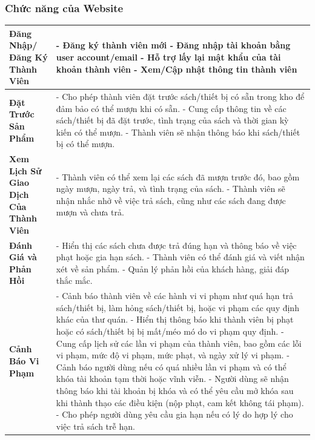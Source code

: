\documentclass{article}
\begin{document}
\subsubsection{Chức năng của Website}
\begin{table}[H]
\centering
\renewcommand{\arraystretch}{1.6}
\begin{tabular}{|p{5cm}|p{10cm}|}
\hline
\textbf{Đăng Nhập/Đăng Ký Thành Viên} & 
- Đăng ký thành viên mới \newline
- Đăng nhập tài khoản bằng user account/email \newline
- Hỗ trợ lấy lại mật khẩu của tài khoản thành viên \newline
- Xem/Cập nhật thông tin thành viên \\
\hline
\textbf{Đặt Trước Sản Phẩm} & 
- Cho phép thành viên đặt trước sách/thiết bị có sẵn trong kho để đảm bảo có thể mượn khi có sẵn. \newline
- Cung cấp thông tin về các sách/thiết bị đã đặt trước, tình trạng của sách và thời gian kỳ kiến có thể mượn. \newline
- Thành viên sẽ nhận thông báo khi sách/thiết bị có thể mượn. \\
\hline
\textbf{Xem Lịch Sử Giao Dịch Của Thành Viên} & 
- Thành viên có thể xem lại các sách đã mượn trước đó, bao gồm ngày mượn, ngày trả, và tình trạng của sách. \newline
- Thành viên sẽ nhận nhắc nhở về việc trả sách, cũng như các sách đang được mượn và chưa trả. \\
\hline
\textbf{Đánh Giá và Phản Hồi} & 
- Hiển thị các sách chưa được trả đúng hạn và thông báo về việc phạt hoặc gia hạn sách. \newline
- Thành viên có thể đánh giá và viết nhận xét về sản phẩm. \newline
- Quản lý phản hồi của khách hàng, giải đáp thắc mắc. \\
\hline
\textbf{Cảnh Báo Vi Phạm} & 
- Cảnh báo thành viên về các hành vi vi phạm như quá hạn trả sách/thiết bị, làm hỏng sách/thiết bị, hoặc vi phạm các quy định khác của thư quán. \newline
- Hiển thị thông báo khi thành viên bị phạt hoặc có sách/thiết bị bị mất/méo mó do vi phạm quy định. \newline
- Cung cấp lịch sử các lần vi phạm của thành viên, bao gồm các lỗi vi phạm, mức độ vi phạm, mức phạt, và ngày xử lý vi phạm. \newline
- Cảnh báo người dùng nếu có quá nhiều lần vi phạm và có thể khóa tài khoản tạm thời hoặc vĩnh viễn. \newline
- Người dùng sẽ nhận thông báo khi tài khoản bị khóa và có thể yêu cầu mở khóa sau khi thành thạo các điều kiện (nộp phạt, cam kết không tái phạm). \newline
- Cho phép người dùng yêu cầu gia hạn nếu có lý do hợp lý cho việc trả sách trễ hạn. \\
\hline
\end{tabular}
\end{table}
\end{document}
